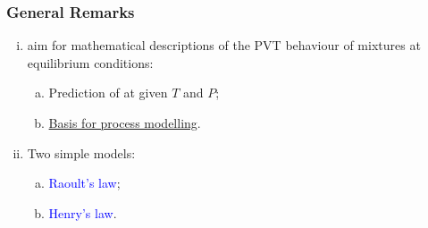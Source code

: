 \documentclass[10pt,compress,handout,ignorenonframetext,unknownkeysallowed]{beamer}
\begin{document}
\begin{frame}
  \frametitle{General Remarks}
  \begin{enumerate}[i)]
      \item<1->  aim for mathematical descriptions of the PVT behaviour of mixtures at equilibrium conditions:
         \begin{enumerate}[a)]
            \item<1-> Prediction of  at given $T$ and $P$;
            \item<1-> \underline{Basis for process modelling}.
         \end{enumerate}
      \item<2-> Two simple models:
         \begin{enumerate}[a)]
            \item<2-> \textcolor{blue}{Raoult's law};
            \item<2-> \textcolor{blue}{Henry's law}.
         \end{enumerate}
  \end{enumerate}
\end{frame}
\end{document}
